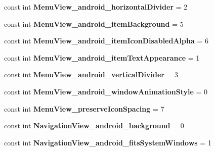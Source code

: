 \begin{DoxyCompactItemize}
const int {\bfseries Menu\+View\+\_\+android\+\_\+horizontal\+Divider} = 2
\item 
\mbox{\label{classXaria_1_1Resource_1_1Styleable_acc57f508ef9ead6318568070219112bf}} 
const int {\bfseries Menu\+View\+\_\+android\+\_\+item\+Background} = 5
\item 
\mbox{\label{classXaria_1_1Resource_1_1Styleable_afd007590328d0969d0d82ca6ac77a44b}} 
const int {\bfseries Menu\+View\+\_\+android\+\_\+item\+Icon\+Disabled\+Alpha} = 6
\item 
\mbox{\label{classXaria_1_1Resource_1_1Styleable_a742939ac819665cb377f29693a91c6b9}} 
const int {\bfseries Menu\+View\+\_\+android\+\_\+item\+Text\+Appearance} = 1
\item 
\mbox{\label{classXaria_1_1Resource_1_1Styleable_af8ba9dc2c85859600a30fa19a704a02c}} 
const int {\bfseries Menu\+View\+\_\+android\+\_\+vertical\+Divider} = 3
\item 
\mbox{\label{classXaria_1_1Resource_1_1Styleable_acb56641d079b4d681f882eebbec1b216}} 
const int {\bfseries Menu\+View\+\_\+android\+\_\+window\+Animation\+Style} = 0
\item 
\mbox{\label{classXaria_1_1Resource_1_1Styleable_a301fd1112fb54ac6c27b316fffa472ff}} 
const int {\bfseries Menu\+View\+\_\+preserve\+Icon\+Spacing} = 7
\item 
\mbox{\label{classXaria_1_1Resource_1_1Styleable_a667fcdfdeb81569098158072d943fa52}} 
const int {\bfseries Navigation\+View\+\_\+android\+\_\+background} = 0
\item 
\mbox{\label{classXaria_1_1Resource_1_1Styleable_a59c911439ec144fb3d1a001ac1143542}} 
const int {\bfseries Navigation\+View\+\_\+android\+\_\+fits\+System\+Windows} = 1
\item 
\mbox{\label{classXaria_1_1Resource_1_1Styleable_a14f710c4c5c9360780304df543f8c242}} 

\end{DoxyCompactItemize}
